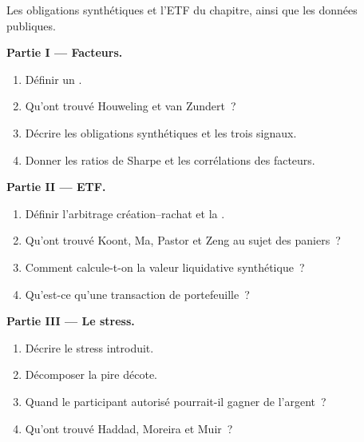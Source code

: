 \begin{problem}\label{pb:s2:systematic-credit-and-bond-etf-arbitrage:1}
Les obligations synthétiques et l'ETF du chapitre, ainsi que les données publiques.

\medskip\noindent\textbf{Partie I --- Facteurs.}
\begin{enumerate}
\item Définir un .
\item Qu'ont trouvé Houweling et van Zundert~?
\item Décrire les obligations synthétiques et les trois signaux.
\item Donner les ratios de Sharpe et les corrélations des facteurs.
\end{enumerate}

\medskip\noindent\textbf{Partie II --- ETF.}
\begin{enumerate}[resume]
\item Définir l'arbitrage création--rachat et la .
\item Qu'ont trouvé Koont, Ma, Pastor et Zeng au sujet des paniers~?
\item Comment calcule-t-on la valeur liquidative synthétique~?
\item Qu'est-ce qu'une transaction de portefeuille~?
\end{enumerate}

\medskip\noindent\textbf{Partie III --- Le stress.}
\begin{enumerate}[resume]
\item Décrire le stress introduit.
\item Décomposer la pire décote.
\item Quand le participant autorisé pourrait-il gagner de l'argent~?
\item Qu'ont trouvé Haddad, Moreira et Muir~?
\end{enumerate}


\end{problem}
